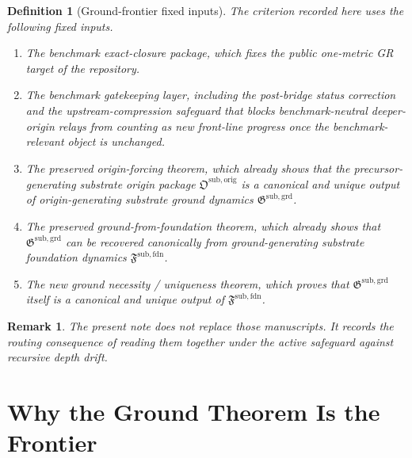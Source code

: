 \documentclass[11pt]{article}
\newcommand{\OriginPackage}{\mathfrak O^{\mathrm{sub,orig}}}
\newcommand{\GroundPackage}{\mathfrak G^{\mathrm{sub,grd}}}
\newcommand{\FoundationPackage}{\mathfrak F^{\mathrm{sub,fdn}}}
\newtheorem{definition}{Definition}
\newtheorem{remark}{Remark}
\begin{document}
\begin{definition}[Ground-frontier fixed inputs]
The criterion recorded here uses the following fixed inputs.
\begin{enumerate}
    \item The benchmark exact-closure package, which fixes the public one-metric GR target of the repository.
    \item The benchmark gatekeeping layer, including the post-bridge status correction and the upstream-compression safeguard that blocks benchmark-neutral deeper-origin relays from counting as new front-line progress once the benchmark-relevant object is unchanged.
    \item The preserved origin-forcing theorem, which already shows that the precursor-generating substrate origin package \(\OriginPackage\) is a canonical and unique output of origin-generating substrate ground dynamics \(\GroundPackage\).
    \item The preserved ground-from-foundation theorem, which already shows that \(\GroundPackage\) can be recovered canonically from ground-generating substrate foundation dynamics \(\FoundationPackage\).
    \item The new ground necessity / uniqueness theorem, which proves that \(\GroundPackage\) itself is a canonical and unique output of \(\FoundationPackage\).
\end{enumerate}
\end{definition}

\begin{remark}
The present note does not replace those manuscripts. It records the routing consequence of reading them together under the active safeguard against recursive depth drift.
\end{remark}

\section{Why the Ground Theorem Is the Frontier}
\end{document}
